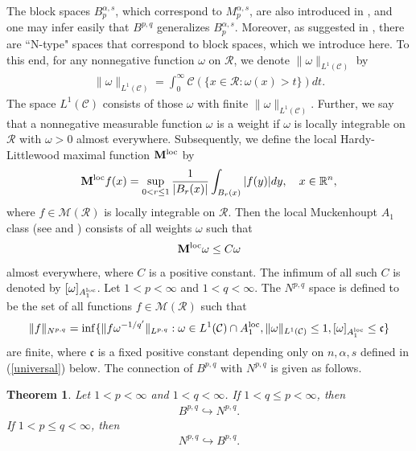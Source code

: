 \documentclass[10pt,reqno]{amsart}
\newtheorem{theorem}{Theorem}[section]
\numberwithin{equation}{section}
\begin{document}
The block spaces $B_{p}^{\alpha,s}$, which correspond to $M_{p}^{\alpha,s}$, are also introduced in \cite{OP}, and one may infer easily that $B^{p,q}$ generalizes $B_{p}^{\alpha,s}$. Moreover, as suggested in \cite{OP}, there are ``N-type" spaces that correspond to block spaces, which we introduce here. To this end, for any nonnegative function $\omega$ on $\mathcal{R}$, we denote $\|\omega\|_{L^{1}(\mathcal{C})}$ by
\begin{align*}
\|\omega\|_{L^{1}(\mathcal{C})}=\int_{0}^{\infty}\mathcal{C}(\{x\in\mathcal{R}:\omega(x)>t\})dt.
\end{align*}
The space $L^{1}(\mathcal{C})$ consists of those $\omega$ with finite $\|\omega\|_{L^{1}(\mathcal{C})}$. Further, we say that a nonnegative measurable function $\omega$ is a weight if $\omega$ is locally integrable on $\mathcal{R}$ with $\omega>0$ almost everywhere. Subsequently, we define the local Hardy-Littlewood maximal function ${\bf M}^{\rm loc}$ by
\begin{align*}
{\bf M}^{\rm loc}f(x)=\sup_{0<r\leq 1}\frac{1}{|B_{r}(x)|}\int_{B_{r}(x)}|f(y)|dy,\quad x\in\mathbb{R}^{n},
\end{align*}
where $f\in\mathcal{M}(\mathcal{R})$ is locally integrable on $\mathcal{R}$. Then the local Muckenhoupt $A_{1}$ class (see \cite{RV} and \cite{OK4}) consists of all weights $\omega$ such that 
\begin{align*}
{\bf M}^{\rm loc}\omega\leq C\omega
\end{align*}
almost everywhere, where $C$ is a positive constant. The infimum of all such $C$ is denoted by $[\omega]_{A_{1}^{\rm loc}}$. Let $1<p<\infty$ and $1<q<\infty$. The $N^{p,q}$ space is defined to be the set of all functions $f\in\mathcal{M}(\mathcal{R})$ such that 
\begin{align*}
\|f\|_{N^{p,q}}=\inf\{\|f\omega^{-1/q'}\|_{L^{p,q}}:\omega\in L^{1}(\mathcal{C})\cap A_{1}^{\rm loc},\|\omega\|_{L^{1}(\mathcal{C})}\leq 1,[\omega]_{A_{1}^{\rm loc}}\leq\mathfrak{c}\}
\end{align*}
are finite, where $\mathfrak{c}$ is a fixed positive constant depending only on $n,\alpha,s$ defined in (\ref{universal}) below. The connection of $B^{p,q}$ with $N^{p,q}$ is given as follows.
\begin{theorem}\label{embed}
Let $1<p<\infty$ and $1<q<\infty$. If $1<q\leq p<\infty$, then 
\begin{align}\label{first embed}
B^{p,q}\hookrightarrow N^{p,q}.
\end{align}
If $1<p\leq q<\infty$, then
\begin{align}\label{second embed}
N^{p,q}\hookrightarrow B^{p,q}.
\end{align}
\end{theorem}
\end{document}
